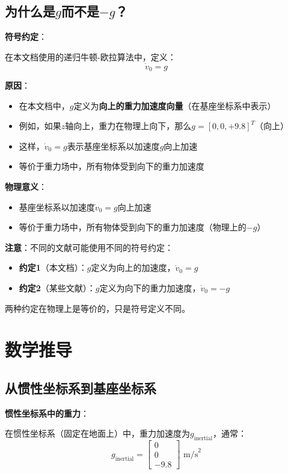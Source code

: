 \documentclass[12pt,a4paper]{article}
\begin{document}
\subsection{为什么是$g$而不是$-g$？}

\textbf{符号约定}：

在本文档使用的递归牛顿-欧拉算法中，定义：
\begin{equation}
\dot{v}_0 = g
\end{equation}

\textbf{原因}：
\begin{itemize}
\item 在本文档中，$g$定义为\textbf{向上的重力加速度向量}（在基座坐标系中表示）
\item 例如，如果$z$轴向上，重力在物理上向下，那么$g = [0, 0, +9.8]^T$（向上）
\item 这样，$\dot{v}_0 = g$表示基座坐标系以加速度$g$向上加速
\item 等价于重力场中，所有物体受到向下的重力加速度
\end{itemize}

\textbf{物理意义}：
\begin{itemize}
\item 基座坐标系以加速度$\dot{v}_0 = g$向上加速
\item 等价于重力场中，所有物体受到向下的重力加速度（物理上的$-g$）
\end{itemize}

\textbf{注意}：不同的文献可能使用不同的符号约定：
\begin{itemize}
\item \textbf{约定1}（本文档）：$g$定义为向上的加速度，$\dot{v}_0 = g$
\item \textbf{约定2}（某些文献）：$g$定义为向下的重力加速度，$\dot{v}_0 = -g$
\end{itemize}

两种约定在物理上是等价的，只是符号定义不同。

\section{数学推导}

\subsection{从惯性坐标系到基座坐标系}

\textbf{惯性坐标系中的重力}：

在惯性坐标系（固定在地面上）中，重力加速度为$g_{\text{inertial}}$，通常：
\begin{equation}
g_{\text{inertial}} = \begin{bmatrix} 0 \\ 0 \\ -9.8 \end{bmatrix} \text{ m/s}^2
\end{equation}
\end{document}
